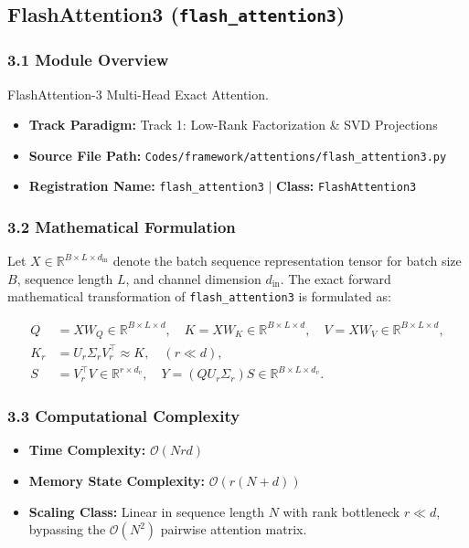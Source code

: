 \subsection{FlashAttention3 (\texttt{flash\_attention3})}
\label{sec:app_module_flash_attention3}

\subsubsection*{3.1 Module Overview}
FlashAttention-3 Multi-Head Exact Attention.
\begin{itemize}
    \item \textbf{Track Paradigm:} Track 1: Low-Rank Factorization \& SVD Projections
    \item \textbf{Source File Path:} \texttt{Codes/framework/attentions/flash\_attention3.py}
    \item \textbf{Registration Name:} \texttt{flash\_attention3} $\mid$ \textbf{Class:} \texttt{FlashAttention3}
\end{itemize}

\subsubsection*{3.2 Mathematical Formulation}
Let $X \in \mathbb{R}^{B \times L \times d_{\text{in}}}$ denote the batch sequence representation tensor for batch size $B$, sequence length $L$, and channel dimension $d_{\text{in}}$. The exact forward mathematical transformation of \texttt{flash\_attention3} is formulated as:

\begin{align}
Q &= X W_Q \in \mathbb{R}^{B \times L \times d}, \quad K = X W_K \in \mathbb{R}^{B \times L \times d}, \quad V = X W_V \in \mathbb{R}^{B \times L \times d}, \\
K_r &= U_r \Sigma_r V_r^\top \approx K, \quad (r \ll d), \\
S &= V_r^\top V \in \mathbb{R}^{r \times d_v}, \quad Y = (Q U_r \Sigma_r) S \in \mathbb{R}^{B \times L \times d_v}.
\end{align}


\subsubsection*{3.3 Computational Complexity}
\begin{itemize}
    \item \textbf{Time Complexity:} $\mathcal{O}(N r d)$
    \item \textbf{Memory State Complexity:} $\mathcal{O}(r(N + d))$
    \item \textbf{Scaling Class:} Linear in sequence length $N$ with rank bottleneck $r \ll d$, bypassing the $\mathcal{O}(N^2)$ pairwise attention matrix.
\end{itemize}

